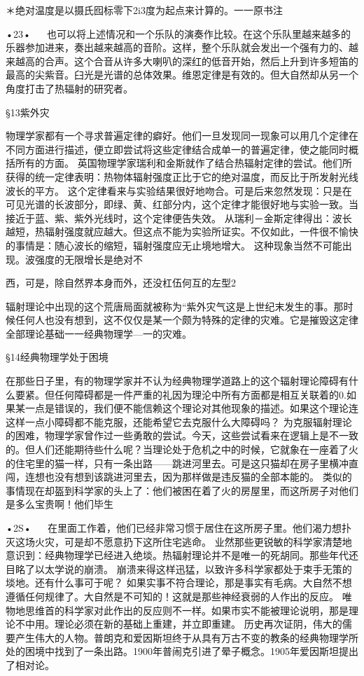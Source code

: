 ＊绝对温度是以摄氏囮标零下2i3度为起点来计算的。一一原书注

•23•
  
也可以将上述情况和一个乐队的演奏作比较。在这个乐队里越来越多的乐器参加进来，奏出越来越高的音阶。这样，整个乐队就会发出一个强有力的、越来越高的合声。这个合音从许多大喇叭的深红的低音开始，然后上升到许多短笛的最高的尖紫音。臼光是光谱的总体效果。维恩定律是有效的。但大自然却从另一个角度打击了热辐射的研究者。

§13紫外灾

物理学家都有一个寻求普遍定律的癖好。他们一旦发现同一现象可以用几个定律在不同方面进行描述，便立即尝试将这些定律结合成单一的普遍定律，使之能同时概括所有的方面。
英国物理学家瑞利和金斯就作了结合热辐射定律的尝试。他们所获得的统一定律表明：热物体辐射强度正比于它的绝对温度，而反比于所发射光线波长的平方。
这个定律看来与实验结果很好地吻合。可是后来忽然发现：只是在可见光谱的长波部分，即绿、黄、红部分内，这个定律才能很好地与实验一致。当接近于蓝、紫、紫外光线时，这个定律便告失效。
从瑞利－金斯定律得出：波长越短，热辐射强度就应越大。但这点不能为实验所证实。不仅如此，一件很不愉快的事情是：随心波长的缩短，辐射强度应无止境地增大。
这种现象当然不可能出现。波强度的无限增长是绝对不


西，可是，除自然界本身而外，还没杠伍何互的左型2

辐射理论中出现的这个荒唐局面就被称为“紫外灾气这是上世纪末发生的事。那时候任何人也没有想到，这不仅仅是某一个颇为特殊的定律的灾难。它是摧毁这定律全部理论基础一一经典物理学—一的灾难。

§14经典物理学处于困境

在那些日子里，有的物理学家并不认为经典物理学道路上的这个辐射理论障碍有什么要紧。但任何障碍都是一件严重的礼因为理沦中所有方面都是相互关联着的0.如果某一点是错误的，我们便不能信赖这个理论对其他现象的描述。如果这个理论连这样一点小障碍都不能克服，还能希望它去克服什么大障碍吗？
为克服辐射理论的困难，物理学家曾作过一些勇敢的尝试。今天，这些尝试看来在逻辑上是不一致的。但人们还能期待些什么呢？当理论处于危机之中的时候，它就象在一座着了火的住宅里的猫一样，只有一条出路——跳进河里去。可是这只猫却在房子里横冲直闯，连想也没有想到该跳进河里去，因为那样做是违反猫的全部本能的。
类似的事情现在却盔到科学家的头上了：他们被困在着了火的房屋里，而这所房子对他们是多么宝贵啊！他们毕生

•2S•
  
在里面工作着，他们已经非常习惯于居住在这所房子里。他们渴力想扑灭这场火灾，可是却不愿意扔下这所住宅逃命。
业然那些更锐敏的科学家清楚地意识到：经典物理学已经进入绝埮。热辐射理论并不是唯一的死胡同。那些年代还目眳了以太学说的崩溃。
崩溃来得这样迅猛，以致许多科学家都处于束手无策的埮地。还有什么事可于呢？
如果实事不符合理论，那是事实有毛病。大自然不想遵循任何规律了。大自然是不可知的！这就是那些神经衰弱的人作出的反应。
唯物地思维首的科学家对此作出的反应则不一样。如果市实不能被理论说明，那是理论不中用。理论必须在新的基础上重建，并立即重建。
历史再次证阴，伟大的儒要产生伟大的人物。普朗克和爱因斯坦终于从具有万古不变的教条的经典物理学所处的困境中找到了一条出路。1900年普闹克引进了晕子概念。1905年爱因斯坦提出了相对论。

